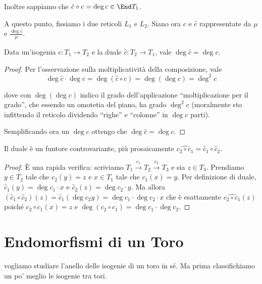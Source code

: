 	Inoltre sappiamo che $\hat c \circ c = \deg c \in \End T_1$.

	A questo punto, fissiamo i due reticoli $L_1$ e $L_2$. Siano ora $c$ e $\hat c$ rappresentate da $\mu$ e $\frac{\deg c}\mu$.

    \begin{proposizione}
        Data un'isogenia $c:T_1\to T_2$ e la duale $\hat c:T_2\to T_1$, vale $\deg\hat c=\deg c$.
    \end{proposizione}
    \begin{proof}
        Per l'osservazione sulla moltiplicatività della composizione, vale
    	\[
    		\deg \hat c \cdot \deg c = \deg(\hat c \circ c) = \deg(\deg c) = \deg^2 c
    	\]

    	dove con $\deg(\deg c)$ indico il grado dell'applicazione ``moltiplicazione per il grado'', che essendo un omotetia del piano, ha grado $\deg^2 c$ (moralmente sto infittendo il reticolo dividendo ``righe'' e ``colonne'' in $\deg c$ parti).

    	Semplificando ora un $\deg c$ ottengo che $\deg \hat c = \deg c$.
    \end{proof}


    \begin{proposizione}
        Il duale è un funtore controvariante, più prosaicamente $\hat{c_2 \circ c_1} = \hat c_1 \circ \hat c_2$.
    \end{proposizione}
    \begin{proof}
        È una rapida verifica: scriviamo $T_1\xrightarrow{c_1}T_2\xrightarrow{c_2}T_3$ e sia $z\in T_3$. Prendiamo $y\in T_2$ tale che $c_2(y)=z$ e $x\in T_1$ tale che $c_1(x)=y$.
         Per definizione di duale, $\hat c_1(y)=\deg c_1\cdot x$ e $\hat c_2(z)=\deg c_2\cdot y$.
        Ma allora $(\hat c_1\circ\hat c_2)(z)=\hat c_1(\deg c_2 y)=\deg c_1\cdot\deg c_2 \cdot x$ che è esattamente $\hat{c_2\circ c_1}(z)$ poiché $c_2\circ c_1(x)=z$ e $\deg(c_2\circ c_1)=\deg c_1\cdot\deg c_2$.
    \end{proof}


\section{Endomorfismi di un Toro}
     vogliamo studiare l'anello delle isogenie di un toro in sé. Ma prima classifichiamo un po' meglio le isogenie tra tori.

